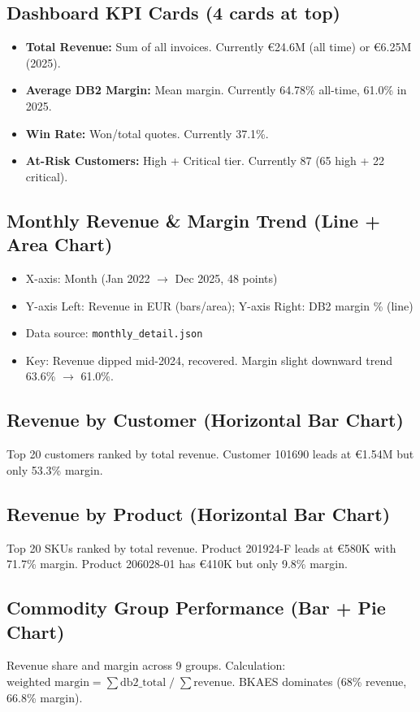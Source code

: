 \documentclass[11pt,a4paper]{article}
\newcommand{\EUR}{\euro{}}
\newcommand{\code}[1]{\texttt{#1}}
\begin{document}
\subsection{Dashboard KPI Cards (4 cards at top)}
\begin{itemize}[nosep]
  \item \textbf{Total Revenue:} Sum of all invoices. Currently \EUR24.6M (all time) or \EUR6.25M (2025).
  \item \textbf{Average DB2 Margin:} Mean margin. Currently 64.78\% all-time, 61.0\% in 2025.
  \item \textbf{Win Rate:} Won/total quotes. Currently 37.1\%.
  \item \textbf{At-Risk Customers:} High + Critical tier. Currently 87 (65 high + 22 critical).
\end{itemize}

\subsection{Monthly Revenue \& Margin Trend (Line + Area Chart)}
\begin{itemize}[nosep]
  \item X-axis: Month (Jan 2022 $\to$ Dec 2025, 48 points)
  \item Y-axis Left: Revenue in EUR (bars/area); Y-axis Right: DB2 margin \% (line)
  \item Data source: \code{monthly\_detail.json}
  \item Key: Revenue dipped mid-2024, recovered. Margin slight downward trend 63.6\% $\to$ 61.0\%.
\end{itemize}

\subsection{Revenue by Customer (Horizontal Bar Chart)}
Top 20 customers ranked by total revenue. Customer 101690 leads at \EUR1.54M but only 53.3\% margin.

\subsection{Revenue by Product (Horizontal Bar Chart)}
Top 20 SKUs ranked by total revenue. Product 201924-F leads at \EUR580K with 71.7\% margin. Product 206028-01 has \EUR410K but only 9.8\% margin.

\subsection{Commodity Group Performance (Bar + Pie Chart)}
Revenue share and margin across 9 groups. Calculation: $\text{weighted margin} = \sum \text{db2\_total} \;/\; \sum \text{revenue}$. BKAES dominates (68\% revenue, 66.8\% margin).
\end{document}
